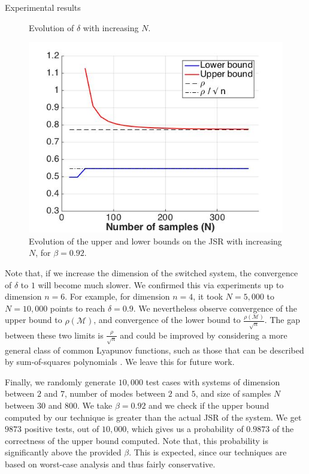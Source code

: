 \begin{subsection}{Experimental results}
\begin{figure}
\begin{center}
\caption{Evolution of $\delta$ with increasing $N$.}
\label{fig:11}
\end{center}
\end{figure}

\begin{figure}
\begin{center}
\includegraphics[trim = 5mm 5mm 5mm 5mm,scale=0.35]{bounds1.jpg}

\caption{Evolution of the upper and lower bounds on the JSR with increasing $N$, for $\beta=0.92$.}
\label{fig:21}
\end{center}
\end{figure}

Note that, if we increase the dimension of the switched system, the convergence of $\delta$ to $1$ will become much slower. We confirmed this via experiments up to dimension $n=6$. For example, for dimension $n=4$, it took $N=5,000$ to $N=10,000$ points to reach $\delta = 0.9$. We nevertheless observe convergence of the upper bound to $\rho(\mathcal{M})$, and convergence of the lower bound to $\frac{\rho(\mathcal{M})}{\sqrt{n}}$. The gap between these two limits is $\frac{\rho}{\sqrt{n}}$ and could be improved by considering a more general class of common Lyapunov functions, such as those that can be described by sum-of-squares polynomials \cite{sosLyap}. We leave this for future work.

Finally, we randomly generate $10,000$ test cases with systems of dimension between $2$ and $7$, number of modes between $2$ and $5$, and size of samples $N$ between $30$ and $800$. We take $\beta = 0.92$ and we check if the upper bound computed by our technique is greater than the actual JSR of the system. We get $9873$ positive tests, out of $10,000$, which gives us a probability of $0.9873$ of the correctness of the upper bound computed. Note that, this probability is significantly above the provided $\beta$. This is expected, since our techniques are based on worst-case analysis and thus fairly conservative.
\end{subsection}



